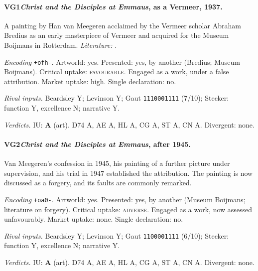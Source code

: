 \paragraph{VG1\enspace \emph{Christ and the Disciples at Emmaus}, as a Vermeer, 1937.}
A painting by Han van Meegeren acclaimed by the Vermeer scholar Abraham Bredius as an early masterpiece of Vermeer and acquired for the Museum Boijmans in Rotterdam. \textit{Literature:} \citet{Bredius1937}.\par
\noindent\textit{Encoding} \texttt{+ofh-}. Artworld: yes. Presented: yes, by another (Bredius; Museum Boijmans). Critical uptake: \textsc{favourable}. Engaged as a work, under a false attribution. Market uptake: high. Single declaration: no.\par
\noindent\textit{Rival inputs.} Beardsley Y; Levinson Y; Gaut \texttt{1110001111} (7/10); Stecker: function Y, excellence N; narrative Y.\par
\noindent\textit{Verdicts.} IU: \textbf{A} (art). D74 A, AE A, HL A, CG A, ST A, CN A. Divergent: none.\par

\paragraph{VG2\enspace \emph{Christ and the Disciples at Emmaus}, after 1945.}
Van Meegeren's confession in 1945, his painting of a further picture under supervision, and his trial in 1947 established the attribution. The painting is now discussed as a forgery, and its faults are commonly remarked.\par
\noindent\textit{Encoding} \texttt{+oa0-}. Artworld: yes. Presented: yes, by another (Museum Boijmans; literature on forgery). Critical uptake: \textsc{adverse}. Engaged as a work, now assessed unfavourably. Market uptake: none. Single declaration: no.\par
\noindent\textit{Rival inputs.} Beardsley Y; Levinson Y; Gaut \texttt{1100001111} (6/10); Stecker: function Y, excellence N; narrative Y.\par
\noindent\textit{Verdicts.} IU: \textbf{A} (art). D74 A, AE A, HL A, CG A, ST A, CN A. Divergent: none.\par

